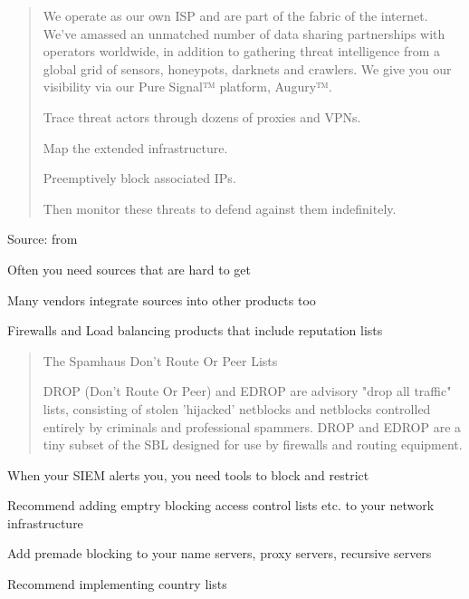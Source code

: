 \documentclass[Screen16to9,17pt]{foils}
\begin{document}
\begin{quote}
  We operate as our own ISP and are part of the fabric of the internet. We’ve amassed an unmatched number of data sharing partnerships with operators worldwide, in addition to gathering threat intelligence from a global grid of sensors, honeypots, darknets and crawlers. We give you our visibility via our Pure Signal™ platform, Augury™.

\begin{list2}
\item Trace threat actors through dozens of proxies and VPNs.
\item Map the extended infrastructure.
\item Preemptively block associated IPs.
\item Then monitor these threats to defend against them indefinitely.
\end{list2}
\end{quote}
Source: from 

\begin{list2}
\item Often you need sources that are hard to get
\item Many vendors integrate sources into other products too
\item Firewalls and Load balancing products that include reputation lists
\end{list2}


\begin{quote}
The Spamhaus Don't Route Or Peer Lists

DROP (Don't Route Or Peer) and EDROP are advisory "drop all traffic" lists, consisting of stolen 'hijacked' netblocks and netblocks controlled entirely by criminals and professional spammers. DROP and EDROP are a tiny subset of the SBL designed for use by firewalls and routing equipment.
\end{quote}



\begin{list2}
\item When your SIEM alerts you, you need tools to block and restrict
\item Recommend adding emptry blocking access control lists etc. to your network infrastructure
\item Add premade blocking to your name servers, proxy servers, recursive servers
\item Recommend implementing country lists
\end{list2}
\end{document}
